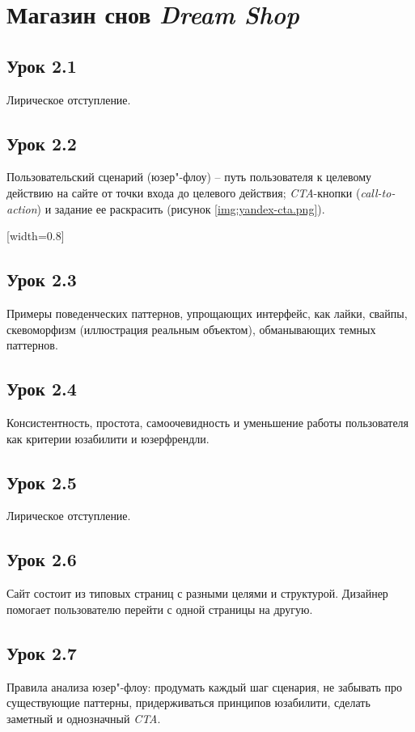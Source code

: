 \documentclass[variant=practice]{bsuir}
\begin{document}
\section{Магазин снов \textit{Dream Shop}}

\subsection{Урок 2.1} Лирическое отступление.

\subsection{Урок 2.2} Пользовательский сценарий (юзер"-флоу) -- путь
пользователя к целевому действию на сайте от точки входа до целевого действия;
\textit{CTA}-кнопки (\textit{call-to-action}) и задание ее раскрасить (рисунок
\ref{img:yandex-cta.png}).

[width=0.8\textwidth]

\subsection{Урок 2.3} Примеры поведенческих паттернов, упрощающих интерфейс, как
лайки, свайпы, скевоморфизм (иллюстрация реальным объектом), обманывающих темных
паттернов.

\subsection{Урок 2.4} Консистентность, простота, самоочевидность и уменьшение
работы пользователя как критерии юзабилити и юзерфрендли.

\subsection{Урок 2.5} Лирическое отступление.

\subsection{Урок 2.6} Сайт состоит из типовых страниц с разными целями и
структурой. Дизайнер помогает пользователю перейти с одной страницы на другую.

\subsection{Урок 2.7} Правила анализа юзер"-флоу: продумать каждый шаг сценария,
не забывать про существующие паттерны, придерживаться принципов юзабилити,
сделать заметный и однозначный \textit{CTA}.
\end{document}

